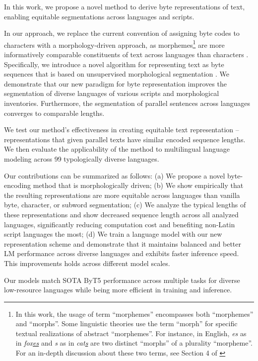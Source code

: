 In this work, we propose a novel method to derive byte representations of text, enabling equitable segmentations across languages and scripts.

In our approach, we replace the current convention of assigning byte codes to characters with a morphology-driven approach, as morphemes\footnote{In this work, the usage of term ``morphemes'' encompasses both ``morphemes'' and ``morphs''. Some linguistic theories use the term ``morph'' for specific textual realizations of abstract ``morphemes''. For instance, in English, \textit{es} as in \textit{fox\underline{es}} and \textit{s} as in \textit{cat\underline{s}} are two distinct ``morphs'' of a plurality ``morpheme''. For an in-depth discussion about these two terms, see Section 4 of \citet{zabokrtsky-etal-2022-towards}} are more informatively comparable constituents of text across languages than characters \cite{cotterell_are_2018}. Specifically, we introduce a novel algorithm for representing text as byte sequences that is based on unsupervised morphological segmentation \cite{smit-etal-2014-morfessor}. We demonstrate that our new paradigm for byte representation improves the segmentation of diverse languages of various scripts and morphological inventories. Furthermore, the segmentation of parallel sentences across languages converges to comparable lengths. 

We test our method's effectiveness in creating equitable text representation -- representations that given parallel texts have similar encoded sequence lengths. We then evaluate the applicability of the method to multilingual language modeling across 99 typologically diverse languages.

Our contributions can be summarized as follows: (a) We propose a novel byte-encoding method that is morphologically driven; (b) We show empirically that the resulting representations are more equitable across languages than vanilla byte, character, or subword segmentation; (c) We analyze the typical lengths of these representations and show decreased sequence length across all analyzed languages, significantly reducing computation cost and benefiting non-Latin script languages the most; (d) We train a language model with our new representation scheme and demonstrate that it maintains balanced and better LM performance across diverse languages and exhibits faster inference speed. This improvements holds across different model scales. 

Our models match SOTA ByT5 performance across multiple tasks for diverse low-resource languages while being more efficient in training and inference.

